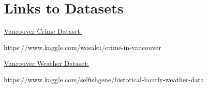 \documentclass[conference]{IEEEtran}
\begin{document}
    \section{Links to Datasets}

    \href{https://www.kaggle.com/wosaku/crime-in-vancouver}{Vancouver Crime Dataset:}

    \begin{footnotesize}
        https://www.kaggle.com/wosaku/crime-in-vancouver\\    
    \end{footnotesize}
    

    \href{https://www.kaggle.com/selfishgene/historical-hourly-weather-data}{Vancouver Weather Dataset:}

    \begin{footnotesize}
        https://www.kaggle.com/selfishgene/historical-hourly-weather-data    
    \end{footnotesize}
    
\end{document}
